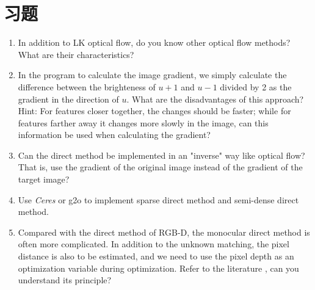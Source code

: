 \section*{习题}
\begin{enumerate}
	\item In addition to LK optical flow, do you know other optical flow methods? What are their characteristics?
	\item In the program to calculate the image gradient, we simply calculate the difference between the brighteness of $u+1$ and $u-1$ divided by 2 as the gradient in the direction of $u$. What are the disadvantages of this approach? Hint: For features closer together, the changes should be faster; while for features farther away it changes more slowly in the image, can this information be used when calculating the gradient?
	\item Can the direct method be implemented in an "inverse" way like optical flow? That is, use the gradient of the original image instead of the gradient of the target image?
	\item[\optional] Use \textit{Ceres} or g2o to implement sparse direct method and semi-dense direct method.
	\item Compared with the direct method of RGB-D, the monocular direct method is often more complicated. In addition to the unknown matching, the pixel distance is also to be estimated, and we need to use the pixel depth as an optimization variable during optimization. Refer to the literature \cite{Engel2013, Engel2014}, can you understand its principle?
\end{enumerate}


